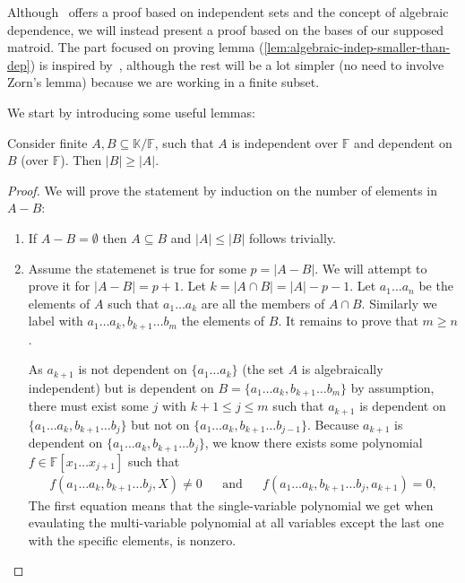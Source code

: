 Although~\cite{oxley1} offers a proof based on independent sets and the concept of algebraic dependence, we will instead present a proof based on the bases of our supposed matroid. The part focused on proving lemma (\ref{lem:algebraic-indep-smaller-than-dep}) is inspired by~\cite{milne2022}, although the rest will be a lot simpler (no need to involve Zorn's lemma) because we are working in a finite subset.


We start by introducing some useful lemmas:
\begin{lemma}\label{lem:algebraic-indep-smaller-than-dep}
	Consider finite $A, B \subseteq \mathbb K / \mathbb F$, such that $A$ is independent over $\mathbb F$ and dependent on $B$ (over $\mathbb F$). Then $|B| \geq |A|$.
\end{lemma}

\begin{proof}
	We will prove the statement by induction on the number of elements in $A - B$:
	\begin{enumerate}
		\item If $A - B = \emptyset $ then $A \subseteq B$ and $|A| \leq |B|$ follows trivially.
		\item Assume the statemenet is true for some $p = |A - B| $. We will attempt to prove it for $|A - B| = p + 1$. Let $k = |A \cap B| = |A| - p - 1$. Let $a _1 \ldots a _n$ be the elements of $A$ such that $a _1 \ldots a_k$ are all the members of $A \cap B$. Similarly we label with $ a _1 \ldots a_k, b _{k + 1} \ldots b _m$ the elements of $B$. It remains to prove that $m \geq n$.

		      As $a _{k + 1}$ is not dependent on $\{a _1 \ldots a_k\}$ (the set $A$ is algebraically independent) but is dependent on $B = \{a _1 \ldots a _k, b _{k + 1} \ldots b_m\}$ by assumption, there must exist some $j$ with $k + 1 \leq j \leq m$ such that $a _{k + 1}$ is dependent on $\{a _1 \ldots a _k, b _{k + 1} \ldots b_j\}$ but  not on $\{a _1 \ldots a _k, b _{k + 1} \ldots b _{j - 1}\}$. Because $a _{k + 1}$ is dependent on $\{a _1 \ldots a _k, b _{k + 1} \ldots b_j\}$, we know there exists some polynomial $f \in \mathbb F[x _1 \ldots x _{j + 1}]$ such that
		      \begin{align*}
			      f(a _1 \ldots a _{k}, b _{k + 1} \ldots b _{j}, X) \neq  0 &&\text{and}&&
			      f(a _1 \ldots a _{k}, b _{k + 1} \ldots b _{j}, a _{k + 1})  = 0,
		      \end{align*}
        The first equation means that the single-variable polynomial we get when evaulating the multi-variable polynomial at all variables except the last one with the specific elements, is nonzero. 


\end{enumerate}
\end{proof}
